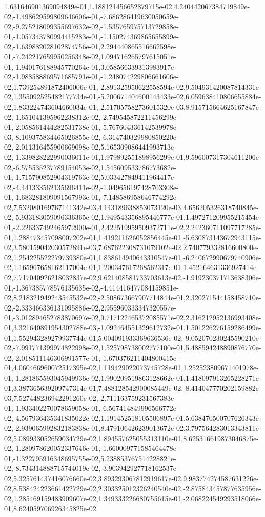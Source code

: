 1.631646901369094849e-01,1.188121456652879715e-02,4.240442067384719849e-02,-1.498629599809646606e-01,-7.686286419630050659e-02,-9.275218099355697632e-02,-1.535765975713729858e-01,-1.057343780994415283e-01,-1.150274369865655899e-02,-1.639882028102874756e-01,2.294440865516662598e-01,-7.242217659950256348e-02,1.094716265797615051e-01,-1.940176188945770264e-01,3.058566339313983917e-02,-1.988588869571685791e-01,-1.248074229806661606e-02,1.739254891872406006e-01,-2.891325950622558594e-02,9.504931420087814331e-02,1.355092525482177734e-01,-5.200671404600143433e-02,6.059638410806655884e-02,1.833224743604660034e-01,-2.517057582736015320e-03,8.915715664625167847e-02,-1.651041395962238312e-02,-2.749545872211456299e-01,-2.058561444282531738e-01,-5.767604336142539978e-03,-8.109375834465026855e-02,-6.314740329980850220e-02,-2.011316455900669098e-02,5.165309086441993713e-02,-1.339828222990036011e-01,1.979892551898956299e-01,9.596007317304611206e-02,-6.575535237789154053e-02,1.545609533786773682e-01,-1.715790852904319763e-02,5.033427849411964417e-02,-4.441333562135696411e-02,-1.049656197428703308e-01,-1.683281809091567993e-01,-7.148586958646774292e-02,7.532080169767141342e-03,4.143189638853073120e-03,4.656205326318740845e-02,-5.933183059096336365e-02,1.949543356895446777e-01,1.497271209955215454e-01,-2.226337492465972900e-01,2.422519959509372711e-02,2.242360711097717285e-01,1.288473457098007202e-01,1.419211626052856445e-01,-5.630873143672943115e-02,3.580159042030572891e-03,7.687622308731079102e-02,2.740779332816600800e-02,1.254225522279739380e-01,1.838614940643310547e-01,-6.240672990679740906e-02,1.165967658162117004e-01,1.200347617268562317e-01,1.452164631336927414e-02,7.717040926218032837e-02,9.621408581733703613e-02,-1.919230371713638306e-01,-1.367385778576135635e-02,-4.414416477084159851e-02,8.218321949243545532e-02,-2.508673667907714844e-01,2.320271544158458710e-02,-2.333466336131095886e-02,2.955960333347320557e-01,-3.012894652783870697e-02,9.717122465372085571e-02,2.316212952136993408e-01,3.321640891954302788e-03,-1.092464551329612732e-01,1.501226276159286499e-01,1.552943289279937744e-01,5.004091933369636536e-02,-9.052070230245590210e-02,-7.991771399974822998e-02,1.525798738002777100e-01,5.488594248890876770e-02,-2.018511146306991577e-01,-1.670376211404800415e-01,4.060466960072517395e-02,1.119429022073745728e-01,1.252523809671401978e-01,-1.281865593045949936e-02,1.990209519863128662e-01,1.418097913265228271e-01,3.387365639209747314e-01,7.488128542900085449e-02,-8.414047770202159882e-03,7.527448236942291260e-02,-2.711163759231567383e-01,-1.933402270078659058e-01,-6.567414849996566772e-02,-4.567936435341835022e-02,1.191452518105506897e-01,5.638470500707626343e-02,-2.939065992832183838e-01,8.479106426239013672e-02,3.797564283013343811e-02,5.089933052659034729e-02,1.894557625055313110e-01,8.625316619873046875e-02,-1.280978620052337646e-01,-1.660009771585464478e-01,-1.322795916348695755e-02,5.238853767514228821e-02,-8.734314888715744019e-02,-3.903942927718162537e-02,5.325761437416076660e-02,3.893293067812919617e-02,9.983774274587631226e-02,8.538424223661422729e-02,2.303325012326240540e-02,-2.875843457877635956e-02,1.285469159483909607e-02,1.349333226680755615e-01,-2.068224549293518066e-01,8.624059706926345825e-02
